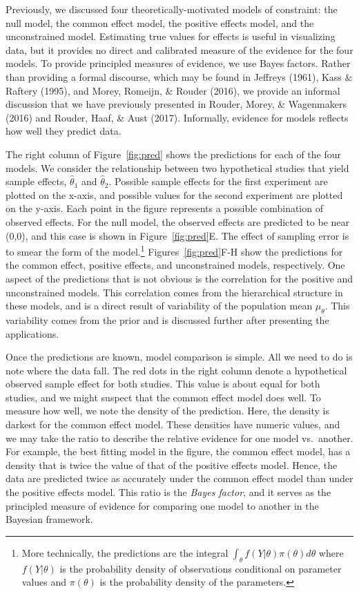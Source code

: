 \documentclass[english,man]{apa6}
\theoremstyle{definition}
\theoremstyle{definition}
\theoremstyle{remark}
\begin{document}
Previously, we discussed four theoretically-motivated models of
constraint: the null model, the common effect model, the positive
effects model, and the unconstrained model. Estimating true values for
effects is useful in visualizing data, but it provides no direct and
calibrated measure of the evidence for the four models. To provide
principled measures of evidence, we use Bayes factors. Rather than
providing a formal discourse, which may be found in Jeffreys (1961),
Kass \& Raftery (1995), and Morey, Romeijn, \& Rouder (2016), we provide
an informal discussion that we have previously presented in Rouder,
Morey, \& Wagenmakers (2016) and Rouder, Haaf, \& Aust (2017).
Informally, evidence for models reflects how well they predict data.

The right column of Figure~\ref{fig:pred} shows the predictions for each
of the four models. We consider the relationship between two
hypothetical studies that yield sample effects, \(\hat{\theta}_1\) and
\(\hat{\theta}_2\). Possible sample effects for the first experiment are
plotted on the x-axis, and possible values for the second experiment are
plotted on the y-axis. Each point in the figure represents a possible
combination of observed effects. For the null model, the observed
effects are predicted to be near (0,0), and this case is shown in
Figure~\ref{fig:pred}E. The effect of sampling error is to smear the
form of the model.\footnote{More technically, the predictions are the
  integral \(\int_\theta f(Y|\theta)\pi(\theta)d\theta\) where
  \(f(Y|\theta)\) is the probability density of observations conditional
  on parameter values and \(\pi(\theta)\) is the probability density of
  the parameters.} Figures~\ref{fig:pred}F-H show the predictions for
the common effect, positive effects, and unconstrained models,
respectively. One aspect of the predictions that is not obvious is the
correlation for the positive and unconstrained models. This correlation
comes from the hierarchical structure in these models, and is a direct
result of variability of the population mean \(\mu_\theta\). This
variability comes from the prior and is discussed further after
presenting the applications.

Once the predictions are known, model comparison is simple. All we need
to do is note where the data fall. The red dots in the right column
denote a hypothetical observed sample effect for both studies. This
value is about equal for both studies, and we might suspect that the
common effect model does well. To measure how well, we note the density
of the prediction. Here, the density is darkest for the common effect
model. These densities have numeric values, and we may take the ratio to
describe the relative evidence for one model vs.~another. For example,
the best fitting model in the figure, the common effect model, has a
density that is twice the value of that of the positive effects model.
Hence, the data are predicted twice as accurately under the common
effect model than under the positive effects model. This ratio is the
\emph{Bayes factor}, and it serves as the principled measure of evidence
for comparing one model to another in the Bayesian framework.
\end{document}
